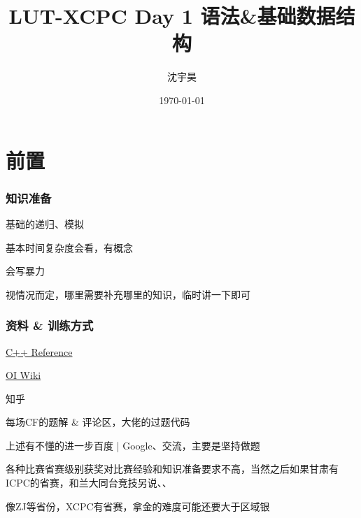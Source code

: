 \documentclass{beamer}
\author{沈宇昊}
\title{LUT-XCPC Day 1 语法\&基础数据结构}
\date{\today}
\institute{兰州理工大学}
\begin{document}

  
  \frame[plain]{\titlepage}
  
  
  \section{前置}


  \begin{frame}
    \frametitle{知识准备}
    基础的递归、模拟

    基本时间复杂度会看，有概念

    会写暴力

    视情况而定，哪里需要补充哪里的知识，临时讲一下即可
  \end{frame}
  \begin{frame}
    \frametitle{资料 \& 训练方式}
    \href{https://en.cppreference.com/w/}{C++ Reference}

    \href{https://oi-wiki.org/}{OI Wiki}

    知乎

    每场CF的题解 \& 评论区，大佬的过题代码

    \vspace*{1\baselineskip}
    
    上述有不懂的进一步百度 | Google、交流，主要是坚持做题
    
    \vspace*{1\baselineskip}
    
    各种比赛省赛级别获奖对比赛经验和知识准备要求不高，当然之后如果甘肃有ICPC的省赛，和兰大同台竞技另说、、
    
    \vspace*{1\baselineskip}

    像ZJ等省份，XCPC有省赛，拿金的难度可能还要大于区域银
  \end{frame}
\end{document}
